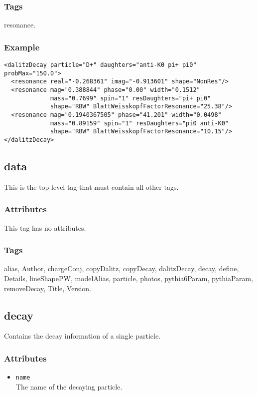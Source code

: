 \subsubsection*{Tags}
resonance.
\subsubsection*{Example}
{\footnotesize
\begin{verbatim}
<dalitzDecay particle="D+" daughters="anti-K0 pi+ pi0" probMax="150.0">
  <resonance real="-0.268361" imag="-0.913601" shape="NonRes"/>
  <resonance mag="0.388844" phase="0.00" width="0.1512"
             mass="0.7699" spin="1" resDaughters="pi+ pi0"
             shape="RBW" BlattWeisskopfFactorResonance="25.38"/>
  <resonance mag="0.1940367505" phase="41.201" width="0.0498"
             mass="0.89159" spin="1" resDaughters="pi0 anti-K0"
             shape="RBW" BlattWeisskopfFactorResonance="10.15"/>
</dalitzDecay>
\end{verbatim}
}

\subsection{data}
This is the top-level tag that must contain all other tags.
\subsubsection*{Attributes}
This tag has no attributes.
\subsubsection*{Tags}
alias, Author, chargeConj, copyDalitz, copyDecay, dalitzDecay, decay, define, Details, lineShapePW, modelAlias, particle, photos, pythia6Param, pythiaParam, removeDecay, Title, Version.

\subsection{decay}
Contains the decay information of a single particle.
\subsubsection*{Attributes}
\begin{itemize}
\item{\tt name}\\
      The name of the decaying particle.
\end{itemize}
